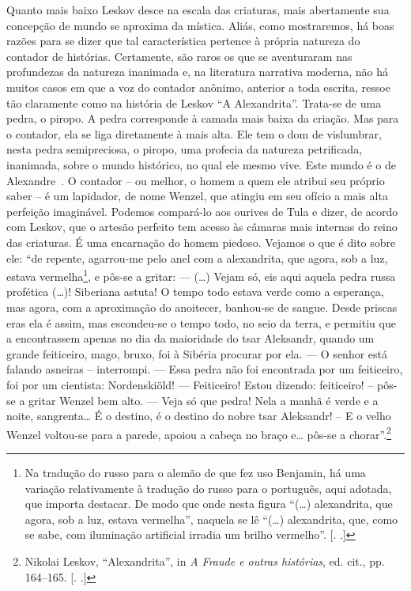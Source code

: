 Quanto mais baixo Leskov desce na escala das criaturas, mais abertamente
sua concepção de mundo se aproxima da mística. Aliás, como mostraremos,
há boas razões para se dizer que tal característica pertence à própria
natureza do contador de histórias. Certamente, são raros os que se
aventuraram nas profundezas da natureza inanimada e, na literatura
narrativa moderna, não há muitos casos em que a voz do contador anônimo,
anterior a toda escrita, ressoe tão claramente como na história de
Leskov ``A Alexandrita''. Trata-se de uma pedra, o piropo. A pedra
corresponde à camada mais baixa da criação. Mas para o contador, ela se
liga diretamente à mais alta. Ele tem o dom de vislumbrar, nesta pedra
semipreciosa, o piropo, uma profecia da natureza petrificada, inanimada,
sobre o mundo histórico, no qual ele mesmo vive. Este mundo é o de
Alexandre~. O contador -- ou melhor, o homem a quem ele atribui seu
próprio saber -- é um lapidador, de nome Wenzel, que atingiu em seu
ofício a mais alta perfeição imaginável. Podemos compará-lo aos ourives
de Tula e dizer, de acordo com Leskov, que o artesão perfeito tem acesso
às câmaras mais internas do reino das criaturas. É uma encarnação do
homem piedoso. Vejamos o que é dito sobre ele: ``de repente, agarrou-me
pelo anel com a alexandrita, que agora, sob a luz, estava
vermelha\footnote{Na tradução do russo para o alemão de que fez uso
  Benjamin, há uma variação relativamente à tradução do russo para o
  português, aqui adotada, que importa destacar. De modo que onde nesta
  figura ``(\ldots{}) alexandrita, que agora, sob a luz, estava
  vermelha'', naquela se lê ``(\ldots{}) alexandrita, que, como se sabe,
  com iluminação artificial irradia um brilho vermelho''. [. .]}, e pôs-se a gritar: --- (\ldots{}) Vejam só, eis aqui aquela pedra
russa profética (\ldots{})! Siberiana astuta! O tempo todo estava verde como
a esperança, mas agora, com a aproximação do anoitecer, banhou-se de
sangue. Desde priscas eras ela é assim, mas escondeu-se o tempo todo, no
seio da terra, e permitiu que a encontrassem apenas no dia da maioridade
do tsar Aleksandr, quando um grande feiticeiro, mago, bruxo, foi à
Sibéria procurar por ela. --- O senhor está falando asneiras --
interrompi. --- Essa pedra não foi encontrada por um feiticeiro, foi por
um cientista: Nordenskiöld! --- Feiticeiro! Estou dizendo: feiticeiro! --
pôs-se a gritar Wenzel bem alto. --- Veja só que pedra! Nela a manhã é
verde e a noite, sangrenta\ldots{} É o destino, é o destino do nobre tsar
Aleksandr! -- E o velho Wenzel voltou-se para a parede, apoiou a cabeça no
braço e\ldots{} pôs-se a chorar''.\footnote{Nikolai Leskov, ``Alexandrita'',
  in \emph{A Fraude e outras histórias}, ed. cit., pp. 164--165. [. .]}

